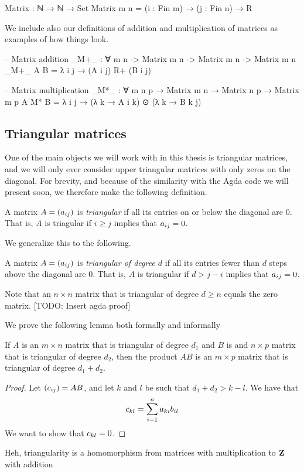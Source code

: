 \documentclass{article}
\begin{document}
\begin{code}
Matrix : ℕ → ℕ → Set
Matrix m n = (i : Fin m) → (j : Fin n) → R
\end{code}

We include also our definitions of addition and multiplication of matrices as examples of how things look.

\begin{code}
-- Matrix addition
_M+_ : ∀ {m n} -> Matrix m n -> Matrix m n -> Matrix m n
_M+_ A B = λ i j → (A i j) R+ (B i j)

-- Matrix multiplication
_M*_ : ∀ {m n p} → Matrix m n → Matrix n p → Matrix m p
A M* B = λ i j → (λ k → A i k) ⊙ (λ k → B k j)
\end{code}
\subsection{Triangular matrices}
One of the main objects we will work with in this thesis is triangular matrices, and we will only ever consider upper triangular matrices with only zeros on the diagonal. For brevity, and because of the similarity with the Agda code we will present soon, we therefore make the following definition.
\begin{Def}
  A matrix $A = (a_{ij})$ is \emph{triangular} if all its entries on or below the diagonal are $0$. That is, $A$ is triagular if $i \ge j$ implies that $a_{ij} = 0$.
\end{Def}
We generalize this to the following.
\begin{Def}
  A matrix $A = (a_{ij})$ is \emph{triangular of degree $d$} if all its entries fewer than $d$ steps above the diagonal are $0$. That is, $A$ is triangular if $d > j - i$ implies that $a_{ij} = 0$.
\end{Def}
\begin{Remark}
  Note that an $n \times n$ matrix that is triangular of degree $d \ge n$ equals the zero matrix. [TODO: Insert agda proof]
\end{Remark}

We prove the following lemma both formally and informally
\begin{Lemma}
  If $A$ is an $m \times n$ matrix that is triangular of degree $d_1$ and $B$ is and $n \times p$ matrix that is triangular of degree $d_2$, then the product $AB$ is an $m \times p$ matrix that is triangular of degree $d_1 + d_2$.
\end{Lemma}
\begin{proof}
  Let $(c_{ij}) = AB$, and let $k$ and $l$ be such that $d_1 + d_2 > k - l$. We have that 
\begin{equation}
  c_{kl} = \sum_{i = 1}^na_{ki}b_{il}
\end{equation}
 We want to show that $c_{kl} = 0$.

  
\end{proof}
Heh, triangularity is a homomorphism from matrices with multiplication to $\mathbf{Z}$ with addition
\end{document}
